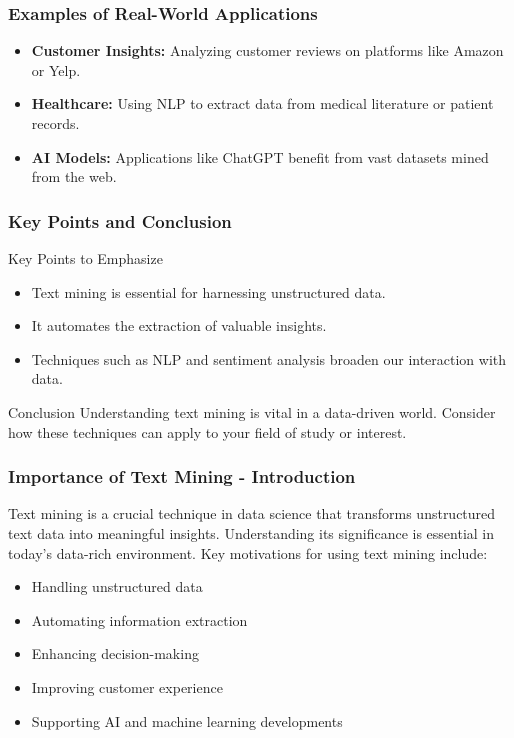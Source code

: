 \documentclass[aspectratio=169]{beamer}
\begin{document}
\begin{frame}[fragile]
    \frametitle{Examples of Real-World Applications}
    \begin{itemize}
        \item \textbf{Customer Insights:} Analyzing customer reviews on platforms like Amazon or Yelp.
        \item \textbf{Healthcare:} Using NLP to extract data from medical literature or patient records.
        \item \textbf{AI Models:} Applications like ChatGPT benefit from vast datasets mined from the web.
    \end{itemize}
\end{frame}

\begin{frame}[fragile]
    \frametitle{Key Points and Conclusion}
    \begin{block}{Key Points to Emphasize}
        \begin{itemize}
            \item Text mining is essential for harnessing unstructured data.
            \item It automates the extraction of valuable insights.
            \item Techniques such as NLP and sentiment analysis broaden our interaction with data.
        \end{itemize}
    \end{block}
    \begin{block}{Conclusion}
        Understanding text mining is vital in a data-driven world. Consider how these techniques can apply to your field of study or interest.
    \end{block}
\end{frame}

\begin{frame}[fragile]
    \frametitle{Importance of Text Mining - Introduction}
    Text mining is a crucial technique in data science that transforms unstructured text data into meaningful insights. Understanding its significance is essential in today’s data-rich environment. Key motivations for using text mining include:

    \begin{itemize}
        \item Handling unstructured data
        \item Automating information extraction
        \item Enhancing decision-making
        \item Improving customer experience
        \item Supporting AI and machine learning developments
    \end{itemize}
\end{frame}
\end{document}
